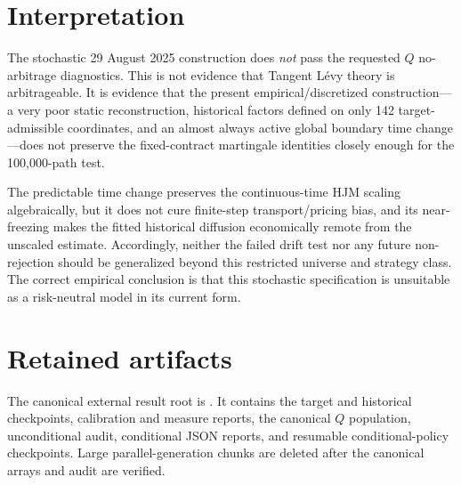 \documentclass[11pt]{article}
\begin{document}
\section{Interpretation}

The stochastic 29 August 2025 construction does \emph{not} pass the requested
$Q$ no-arbitrage diagnostics.  This is not evidence that Tangent L\'evy theory
is arbitrageable.  It is evidence that the present empirical/discretized
construction---a very poor static reconstruction, historical factors defined
on only 142 target-admissible coordinates, and an almost always active global
boundary time change---does not preserve the fixed-contract martingale
identities closely enough for the 100,000-path test.

The predictable time change preserves the continuous-time HJM scaling
algebraically, but it does not cure finite-step transport/pricing bias, and its
near-freezing makes the fitted historical diffusion economically remote from
the unscaled estimate.  Accordingly, neither the failed drift test nor any
future non-rejection should be generalized beyond this restricted universe and
strategy class.  The correct empirical conclusion is that this stochastic
specification is unsuitable as a risk-neutral model in its current form.

\section{Retained artifacts}

{\raggedright
The canonical external result root is
.  It contains the target and
historical checkpoints, calibration and measure reports, the canonical $Q$
population, unconditional audit, conditional JSON reports, and resumable
conditional-policy checkpoints.  Large parallel-generation chunks are
deleted after the canonical arrays and audit are verified.
\par}
\end{document}
